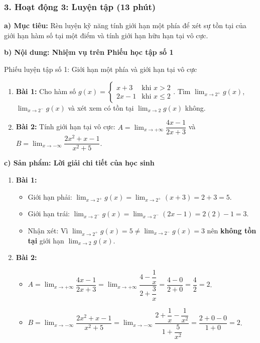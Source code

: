 \documentclass[12pt, a4paper]{article}
\begin{document}
\subsubsection*{3. Hoạt động 3: Luyện tập (13 phút)}

\noindent \textbf{a) Mục tiêu:}
Rèn luyện kỹ năng tính giới hạn một phía để xét sự tồn tại của giới hạn hàm số tại một điểm và tính giới hạn hữu hạn tại vô cực.

\noindent \textbf{b) Nội dung: Nhiệm vụ trên Phiếu học tập số 1}
\begin{pedabox}{Phiếu luyện tập số 1: Giới hạn một phía và giới hạn tại vô cực}
\begin{enumerate}[leftmargin=0.6cm]
    \item \textbf{Bài 1:} Cho hàm số $g(x) = \begin{cases} x + 3 & \text{khi } x > 2 \\ 2x - 1 & \text{khi } x \le 2 \end{cases}$. Tìm $\lim_{x \to 2^+} g(x)$, $\lim_{x \to 2^-} g(x)$ và xét xem có tồn tại $\lim_{x \to 2} g(x)$ không.
    \item \textbf{Bài 2:} Tính giới hạn tại vô cực: $A = \lim_{x \to +\infty} \dfrac{4x - 1}{2x + 3}$ và $B = \lim_{x \to -\infty} \dfrac{2x^2 + x - 1}{x^2 + 5}$.
\end{enumerate}
\end{pedabox}

\noindent \textbf{c) Sản phẩm: Lời giải chi tiết của học sinh}
\begin{enumerate}[leftmargin=0.6cm]
    \item \textbf{Bài 1:}
    \begin{itemize}
        \item Giới hạn phải: $\lim_{x \to 2^+} g(x) = \lim_{x \to 2^+} (x + 3) = 2 + 3 = 5$.
        \item Giới hạn trái: $\lim_{x \to 2^-} g(x) = \lim_{x \to 2^-} (2x - 1) = 2(2) - 1 = 3$.
        \item Nhận xét: Vì $\lim_{x \to 2^+} g(x) = 5 \neq \lim_{x \to 2^-} g(x) = 3$ nên \textbf{không tồn tại} giới hạn $\lim_{x \to 2} g(x)$.
    \end{itemize}
    \item \textbf{Bài 2:}
    \begin{itemize}
        \item $A = \lim_{x \to +\infty} \dfrac{4x - 1}{2x + 3} = \lim_{x \to +\infty} \dfrac{4 - \dfrac{1}{x}}{2 + \dfrac{3}{x}} = \dfrac{4 - 0}{2 + 0} = \dfrac{4}{2} = 2$.
        \item $B = \lim_{x \to -\infty} \dfrac{2x^2 + x - 1}{x^2 + 5} = \lim_{x \to -\infty} \dfrac{2 + \dfrac{1}{x} - \dfrac{1}{x^2}}{1 + \dfrac{5}{x^2}} = \dfrac{2 + 0 - 0}{1 + 0} = 2$.
    \end{itemize}
\end{enumerate}
\end{document}
